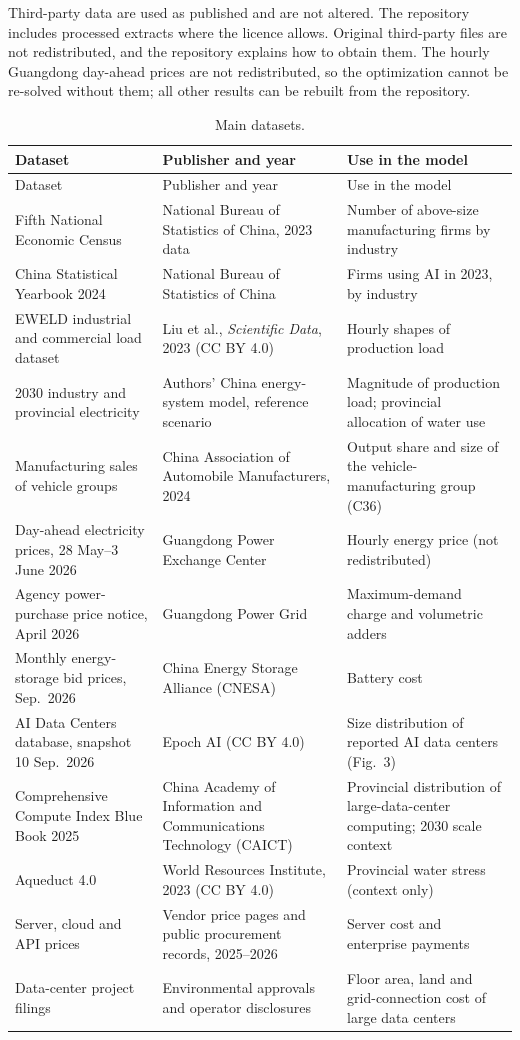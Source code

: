 \documentclass[11pt]{article}
\begin{document}
Third-party data are used as published and are not altered. The repository includes processed extracts where the licence allows. Original third-party files are not redistributed, and the repository explains how to obtain them. The hourly Guangdong day-ahead prices are not redistributed, so the optimization cannot be re-solved without them; all other results can be rebuilt from the repository.

{\small
\begin{longtable}{@{}L{0.27\textwidth}L{0.33\textwidth}L{0.34\textwidth}@{}}
\caption{Main datasets.}\label{tab:sources}\\
\toprule
Dataset & Publisher and year & Use in the model \\
\midrule
\endfirsthead
\toprule
Dataset & Publisher and year & Use in the model \\
\midrule
\endhead
\bottomrule
\endfoot
Fifth National Economic Census & National Bureau of Statistics of China, 2023 data & Number of above-size manufacturing firms by industry \\
China Statistical Yearbook 2024 & National Bureau of Statistics of China & Firms using AI in 2023, by industry \\
EWELD industrial and commercial load dataset & Liu et al., \emph{Scientific Data}, 2023 (CC BY 4.0) & Hourly shapes of production load \\
2030 industry and provincial electricity & Authors' China energy-system model, reference scenario & Magnitude of production load; provincial allocation of water use \\
Manufacturing sales of vehicle groups & China Association of Automobile Manufacturers, 2024 & Output share and size of the vehicle-manufacturing group (C36) \\
Day-ahead electricity prices, 28 May--3 June 2026 & Guangdong Power Exchange Center & Hourly energy price (not redistributed) \\
Agency power-purchase price notice, April 2026 & Guangdong Power Grid & Maximum-demand charge and volumetric adders \\
Monthly energy-storage bid prices, Sep.~2026 & China Energy Storage Alliance (CNESA) & Battery cost \\
AI Data Centers database, snapshot 10 Sep.~2026 & Epoch AI (CC BY 4.0) & Size distribution of reported AI data centers (Fig.~3) \\
Comprehensive Compute Index Blue Book 2025 & China Academy of Information and Communications Technology (CAICT) & Provincial distribution of large-data-center computing; 2030 scale context \\
Aqueduct 4.0 & World Resources Institute, 2023 (CC BY 4.0) & Provincial water stress (context only) \\
Server, cloud and API prices & Vendor price pages and public procurement records, 2025--2026 & Server cost and enterprise payments \\
Data-center project filings & Environmental approvals and operator disclosures & Floor area, land and grid-connection cost of large data centers \\
\end{longtable}}
\end{document}
